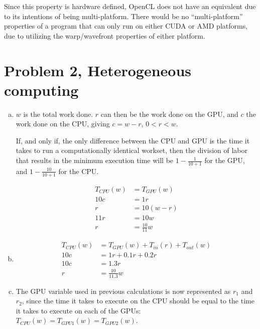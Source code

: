 \documentclass[fontsize=11pt, paper=a4, titlepage]{article}
\begin{document}
\begin{enumerate}[a)]
Since this property is hardware defined, OpenCL does not have an equivalent due
to its intentions of being multi-platform. There would be no ``multi-platform''
properties of a program that can only run on either CUDA or AMD platforms, due
to utilizing the warp/wavefront properties of either platform.

    \end{enumerate}

\section*{Problem 2, Heterogeneous computing}
    \begin{enumerate}[a)]

        \item $w$ is the total work done. $r$ can then be the work done on the
GPU, and $c$ the work done on the CPU, giving $c = w - r$, $0 < r < w$.

If, and only if, the only difference between the CPU and GPU is the time it
takes to run a computationally identical workset, then the division of labor
that results in the minimum execution time will be $1-\frac{1}{10+1}$ for the
GPU, and $1-\frac{10}{10+1}$ for the CPU.

        \begin{align*}
            T_{CPU}(w) &= T_{GPU}(w) \\
            10c &= 1r \\
            r &= 10(w-r) \\
            11r &= 10w \\
            r &= \frac{10}{11}w
        \end{align*}

        \item
        \begin{align*}
            T_{CPU}(w) &= T_{GPU}(w) + T_{in}(r) + T_{out}(w) \\
            10c &= 1r + 0.1r + 0.2r \\
            10c &= 1.3r \\
            r &= \frac{10}{11.3}w
        \end{align*}

        \item The GPU variable used in previous calculations is now represented
as $r_1$ and $r_2$, since the time it takes to execute on the CPU should be
equal to the time it takes to execute on each of the GPUs: $T_{CPU}(w) =
T_{GPU1}(w) = T_{GPU2}(w)$.


\end{enumerate}
\end{document}
